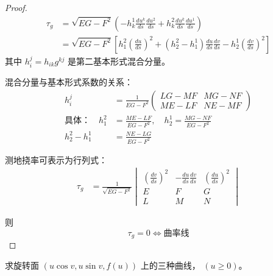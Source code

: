 \documentclass[lang=cn,10pt,thmcnt=section]{elegantbook}
\begin{document}
\begin{proof}
\begin{align*}
\tau_g &= \sqrt{EG-F^2} \left( -h_k^1 \frac{du^k}{ds} \frac{du^2}{ds} + h_k^2 \frac{du^k}{ds} \frac{du^1}{ds} \right) \\
&= \sqrt{EG-F^2} \left[ h_1^2 \left( \frac{du}{ds} \right)^2 + (h_2^2 - h_1^1) \frac{du}{ds} \frac{dv}{ds} - h_2^1 \left( \frac{dv}{ds} \right)^2 \right]
\end{align*}
其中 \(h_i^j = h_{ik} g^{kj}\) 是第二基本形式混合分量。


混合分量与基本形式系数的关系：
\begin{align*}
h_i^j &= \frac{1}{EG-F^2} 
\begin{pmatrix}
LG - MF & MG - NF \\
ME - LF & NE - MF
\end{pmatrix} \\
\text{具体：} \quad 
h_1^2 &= \frac{ME - LF}{EG-F^2}, \quad 
h_2^1 = \frac{MG - NF}{EG-F^2} \\
h_2^2 - h_1^1 &= \frac{NE - LG}{EG-F^2}
\end{align*}

测地挠率可表示为行列式：
\begin{align*}
\tau_g &= \frac{1}{\sqrt{EG-F^2}} 
\begin{vmatrix}
\left( \frac{dv}{ds} \right)^2 & -\frac{du}{ds} \frac{dv}{ds} & \left( \frac{du}{ds} \right)^2 \\
E & F & G \\
L & M & N
\end{vmatrix}
\end{align*}

则
\[ \tau_g = 0 \iff \text{曲率线} \]
\end{proof}
\begin{example}
    求旋转面 $(u \cos v, u \sin v, f(u))$ 上的三种曲线， $(u \geq 0)$。
\end{example}
\end{document}
